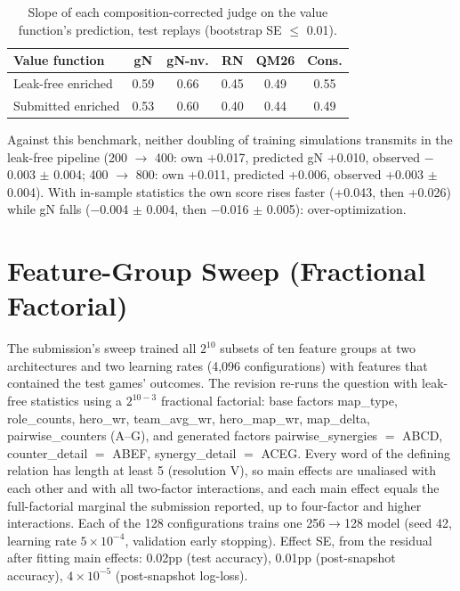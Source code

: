 \documentclass[journal]{IEEEtran}
\begin{document}
\begin{table}[t]
\centering
\caption{Slope of each composition-corrected judge on the value function's prediction, test replays (bootstrap SE $\le$ 0.01).}
\label{tab:atten}
\small
\setlength{\tabcolsep}{3pt}
\begin{tabular}{lccccc}
\toprule
Value function & gN & gN-nv. & RN & QM26 & Cons. \\
\midrule
Leak-free enriched & 0.59 & 0.66 & 0.45 & 0.49 & 0.55 \\
Submitted enriched & 0.53 & 0.60 & 0.40 & 0.44 & 0.49 \\
\bottomrule
\end{tabular}
\end{table}

Against this benchmark, neither doubling of training simulations transmits in the leak-free pipeline (200 $\to$ 400: own +0.017, predicted gN +0.010, observed $-$0.003 $\pm$ 0.004; 400 $\to$ 800: own +0.011, predicted +0.006, observed +0.003 $\pm$ 0.004). With in-sample statistics the own score rises faster (+0.043, then +0.026) while gN falls ($-$0.004 $\pm$ 0.004, then $-$0.016 $\pm$ 0.005): over-optimization.

\section{Feature-Group Sweep (Fractional Factorial)}
\label{sec:sweep}

The submission's sweep trained all $2^{10}$ subsets of ten feature groups at two architectures and two learning rates (4,096 configurations) with features that contained the test games' outcomes. The revision re-runs the question with leak-free statistics using a $2^{10-3}$ fractional factorial: base factors map\_type, role\_counts, hero\_wr, team\_avg\_wr, hero\_map\_wr, map\_delta, pairwise\_counters (A--G), and generated factors pairwise\_synergies $=$ ABCD, counter\_detail $=$ ABEF, synergy\_detail $=$ ACEG. Every word of the defining relation has length at least 5 (resolution V), so main effects are unaliased with each other and with all two-factor interactions, and each main effect equals the full-factorial marginal the submission reported, up to four-factor and higher interactions. Each of the 128 configurations trains one 256$\to$128 model (seed 42, learning rate $5\times10^{-4}$, validation early stopping). Effect SE, from the residual after fitting main effects: 0.02pp (test accuracy), 0.01pp (post-snapshot accuracy), $4\times10^{-5}$ (post-snapshot log-loss).
\end{document}
